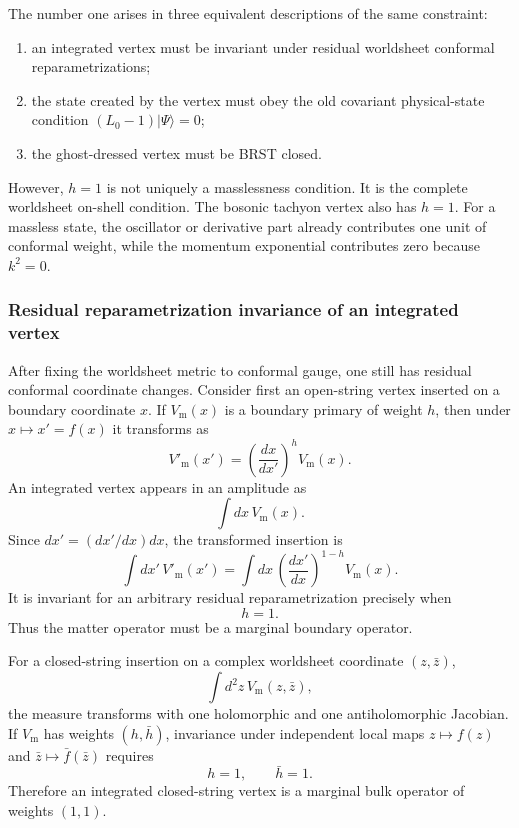 \documentclass[
  10pt,
  a4paper,
  openany]{book}
\providecommand{\tightlist}{%
  \setlength{\itemsep}{0pt}\setlength{\parskip}{0pt}}
\begin{document}
The number one arises in three equivalent descriptions of the same
constraint:

\begin{enumerate}
\def\labelenumi{\arabic{enumi}.}
\tightlist
\item
  an integrated vertex must be invariant under residual worldsheet
  conformal reparametrizations;
\item
  the state created by the vertex must obey the old covariant
  physical-state condition \((L_0-1)|\Psi\rangle=0\);
\item
  the ghost-dressed vertex must be BRST closed.
\end{enumerate}

However, \(h=1\) is not uniquely a masslessness condition. It is the
complete worldsheet on-shell condition. The bosonic tachyon vertex also
has \(h=1\). For a massless state, the oscillator or derivative part
already contributes one unit of conformal weight, while the momentum
exponential contributes zero because \(k^2=0\).

\subsubsection{Residual reparametrization invariance of an integrated
vertex}\label{residual-reparametrization-invariance-of-an-integrated-vertex}

After fixing the worldsheet metric to conformal gauge, one still has
residual conformal coordinate changes. Consider first an open-string
vertex inserted on a boundary coordinate \(x\). If \(V_{\mathrm m}(x)\)
is a boundary primary of weight \(h\), then under \(x\mapsto x'=f(x)\)
it transforms as \[
V'_{\mathrm m}(x')
=\left(\frac{dx}{dx'}\right)^h V_{\mathrm m}(x).
\] An integrated vertex appears in an amplitude as \[
\int dx\,V_{\mathrm m}(x).
\] Since \(dx'=(dx'/dx)dx\), the transformed insertion is \[
\int dx'\,V'_{\mathrm m}(x')
=\int dx\,
\left(\frac{dx'}{dx}\right)^{1-h}V_{\mathrm m}(x).
\] It is invariant for an arbitrary residual reparametrization precisely
when \[
h=1.
\] Thus the matter operator must be a marginal boundary operator.

For a closed-string insertion on a complex worldsheet coordinate
\((z,\bar z)\), \[
\int d^2z\,V_{\mathrm m}(z,\bar z),
\] the measure transforms with one holomorphic and one antiholomorphic
Jacobian. If \(V_{\mathrm m}\) has weights \((h,\bar h)\), invariance
under independent local maps \(z\mapsto f(z)\) and
\(\bar z\mapsto\bar f(\bar z)\) requires \[
h=1,
\qquad
\bar h=1.
\] Therefore an integrated closed-string vertex is a marginal bulk
operator of weights \((1,1)\).
\end{document}
